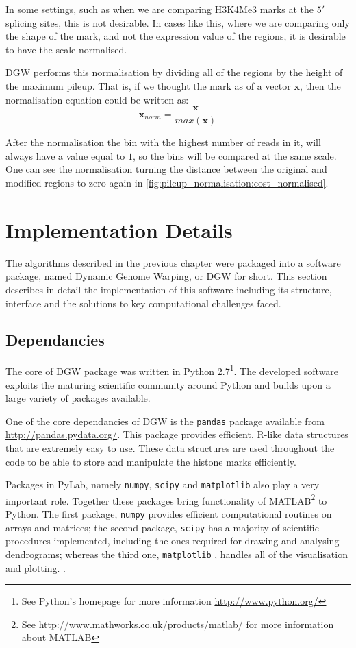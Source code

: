 \documentclass[parskip]{cs4rep}
\newcommand{\histonemodification}[1]{#1}
\newcommand{\pythonpackage}[1]{{\tt #1}}
\begin{document}
In some settings, such as when we are comparing \histonemodification{H3K4Me3} marks at the $5'$ splicing sites, this is not desirable. In cases like this, where we are comparing only the shape of the mark, and not the expression value of the regions, it is desirable to have the scale normalised.

DGW performs this normalisation by dividing all of the regions by the height of the maximum pileup.
That is, if we thought the mark as of a vector $\mathbf{x}$, then the normalisation equation could be written as:
\begin{equation}
   \mathbf{x}_{norm} = \frac{\mathbf{x}}{max (\mathbf{x})}
\end{equation}

After the normalisation the bin with the highest number of reads in it, will always have a value equal to $1$, so the bins will be compared at the same scale. One can see the normalisation turning the distance between the original and modified regions to zero again in \autoref{fig:pileup_normalisation:cost_normalised}.

\chapter{Implementation Details}
The algorithms described in the previous chapter were packaged into a software package, named Dynamic Genome Warping, or DGW for short. This section describes in detail the implementation of this software including its structure, interface and the solutions to key computational challenges faced.

\section{Dependancies}
The core of DGW package was written in Python 2.7\footnote{See Python's homepage for more information \url{http://www.python.org/}}. The developed software exploits the maturing scientific community around Python and builds upon a large variety of packages available.

One of the core dependancies of DGW is the \verb"pandas" package available from \url{http://pandas.pydata.org/}. This package provides efficient, R-like data structures that are extremely easy to use. These data structures are used throughout the code to be able to store and manipulate the histone marks efficiently. 

Packages in PyLab, namely \pythonpackage{numpy}, \pythonpackage{scipy} and \pythonpackage{matplotlib} also play a very important role. Together these packages bring functionality of MATLAB\footnote{See \url{http://www.mathworks.co.uk/products/matlab/} for more information about MATLAB} to Python. The first package, \pythonpackage{numpy} provides efficient computational routines on arrays and matrices; the second package, \pythonpackage{scipy} has a majority of scientific procedures implemented, including the ones required for drawing and analysing dendrograms; whereas the third one, \pythonpackage{matplotlib} \cite{Hunter:2007ux}, handles all of the visualisation and plotting. .
\end{document}
